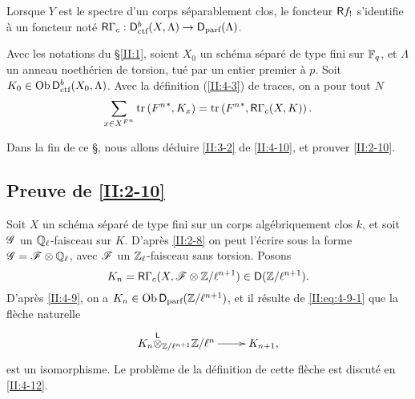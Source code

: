 \documentclass[oneside]{book}
\begin{document}
Lorsque $Y$ est le spectre d'un corps s\'eparablement clos, le foncteur $\mathsf{R} f_!$ 
s'identifie \`a un foncteur not\'e 
$\mathsf{R} \Gamma_c : \mathsf{D}_\text{ctf}^b(X,\Lambda)\to\mathsf{D}_\text{parf}(\Lambda)$. 





\begin{theorem_}\label{II:4-10}
Avec les notations du \S\ref{II:1}, soient $X_0$ un sch\'ema s\'epar\'e de type 
fini sur $\mathbb{F}_q$, et $\Lambda$ un anneau noeth\'erien de torsion, tu\'e par un 
entier premier \`a $p$. Soit $K_0\in\operatorname{Ob}\mathsf{D}_\textnormal{ctf}^b(X_0,\Lambda)$. 
Avec la d\'efinition (\ref{II:4-3}) de traces, on a pour tout $N$ 
\begin{equation}\label{II:eq:4-10}
  \sum_{x\in X^{F^n}} \operatorname{tr}\left({F^n}^*,K_x\right) = \operatorname{tr}\left({F^n}^*,\mathsf{R}\Gamma_c(X,K)\right) \text{.}
\end{equation}
\end{theorem_}

Dans la fin de ce \S, nous allons d\'eduire \ref{II:3-2} de \ref{II:4-10}, et 
prouver \ref{II:2-10}. 





\subsection{Preuve de \texorpdfstring{\ref{II:2-10}}{2.10}}\label{II:4-11}

Soit $X$ un sch\'ema s\'epar\'e de type fini sur un corps alg\'ebriquement clos 
$k$, et soit $\mathscr{G}$ un $\mathbb{Q}_\ell$-faisceau sur $K$. D'apr\`es \ref{II:2-8} on 
peut l'\'ecrire sous la forme $\mathscr{G}=\mathscr{F}\otimes\mathbb{Q}_\ell$, avec $\mathscr{F}$ un 
$\mathbb{Z}_\ell$-faisceau sans torsion. Posons 
\[
  K_n = \mathsf{R} \Gamma_c(X,\mathscr{F}\otimes\mathbb{Z}/\ell^{n+1})\in\mathsf{D}(\mathbb{Z}/\ell^{n+1}) \text{.}
\]
D'apr\`es \ref{II:4-9}, on a $K_n\in\operatorname{Ob}\mathsf{D}_\text{parf}(\mathbb{Z}/\ell^{n+1})$, et il 
r\'esulte de \eqref{II:eq:4-9-1} que la fl\`eche naturelle 
\begin{equation}\label{II:eq:4-11-1}
\xymatrix{
  K_n\lotimes_{\dZ/\ell^{n+1}} \dZ/\ell^n \ar[r] & K_{n+1} \text{,}
}
\end{equation}
est un isomorphisme. Le probl\`eme de la d\'efinition de cette fl\`eche est 
discut\'e en \ref{II:4-12}. 
\end{document}

